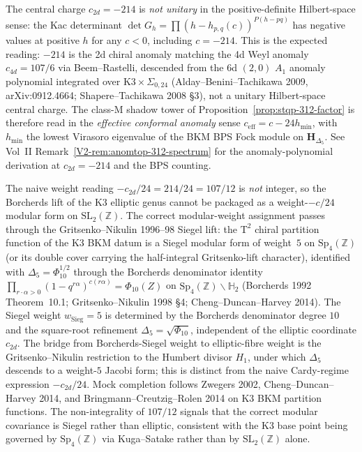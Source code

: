 \begin{remark}[Unitarity scope of $c = -214$]
\label{rem:stqp-unitarity-scope}
The central charge $c_{2d} = -214$ is \emph{not unitary} in the
positive-definite Hilbert-space sense: the Kac determinant
$\det G_h = \prod(h - h_{p,q}(c))^{P(h-pq)}$ has negative values at
positive $h$ for any $c < 0$, including $c = -214$. This is the
expected reading: $-214$ is the 2d chiral anomaly matching the
4d Weyl anomaly $c_{4d} = 107/6$ via Beem--Rastelli, descended
from the 6d $(2,0)$ $A_1$ anomaly polynomial integrated over
$\mathrm{K3}\times\Sigma_{0,24}$ (Alday--Benini--Tachikawa 2009,
arXiv:0912.4664; Shapere--Tachikawa 2008 \S 3), not a unitary
Hilbert-space central charge. The class-$\mathrm M$ shadow tower
of Proposition~\ref{prop:stqp-312-factor} is therefore
read in the \emph{effective conformal anomaly} sense
$c_{\mathrm{eff}} = c - 24 h_{\min}$, with $h_{\min}$ the
lowest Virasoro eigenvalue of the BKM BPS Fock module on
$\mathbf H_{\Delta_5}$. See Vol~II
Remark~\ref{V2-rem:anomtop-312-spectrum} for the
anomaly-polynomial derivation at $c_{2d} = -214$ and the BPS
counting.
\end{remark}

\begin{remark}[Mock-modular shadow weight from $c = -214$;
Siegel weight $5$; \ClaimStatusProvedElsewhere]
\label{rem:stqp-mock-weight}
The naive weight reading $-c_{2d}/24 = 214/24 = 107/12$ is
\emph{not} integer, so the Borcherds lift of the K3 elliptic genus
cannot be packaged as a weight-$-c/24$ modular form on
$\mathrm{SL}_2(\mathbb Z)$. The correct modular-weight assignment
passes through the Gritsenko--Nikulin 1996--98 Siegel lift: the
$\mathrm T^2$ chiral partition function of the K3 BKM datum is a
Siegel modular form of weight~$5$ on $\mathrm{Sp}_4(\mathbb Z)$
(or its double cover carrying the half-integral Gritsenko-lift
character), identified with $\Delta_5 = \Phi_{10}^{1/2}$ through
the Borcherds denominator identity
$\prod_{r\cdot\alpha > 0}(1 - q^{r\alpha})^{c(r\alpha)}
= \Phi_{10}(Z)$ on $\mathrm{Sp}_4(\mathbb Z)\backslash\mathbb H_2$
(Borcherds 1992 Theorem~10.1; Gritsenko--Nikulin 1998
\S 4; Cheng--Duncan--Harvey 2014). The Siegel weight
$w_{\mathrm{Sieg}} = 5$ is determined by the Borcherds
denominator degree $10$ and the square-root refinement
$\Delta_5 = \sqrt{\Phi_{10}}$, independent of the elliptic
coordinate $c_{2d}$. The bridge from Borcherds-Siegel weight to
elliptic-fibre weight is the Gritsenko--Nikulin restriction to
the Humbert divisor $H_1$, under which $\Delta_5$ descends to a
weight-$5$ Jacobi form; this is distinct from the naive
Cardy-regime expression $-c_{2d}/24$. Mock completion follows
Zwegers 2002, Cheng--Duncan--Harvey 2014, and
Bringmann--Creutzig--Rolen 2014 on K3 BKM partition functions.
The non-integrality of $107/12$ signals that the correct modular
covariance is Siegel rather than elliptic, consistent with the K3
base point being governed by
$\mathrm{Sp}_4(\mathbb Z)$ via Kuga--Satake rather than by
$\mathrm{SL}_2(\mathbb Z)$ alone.
\end{remark}

